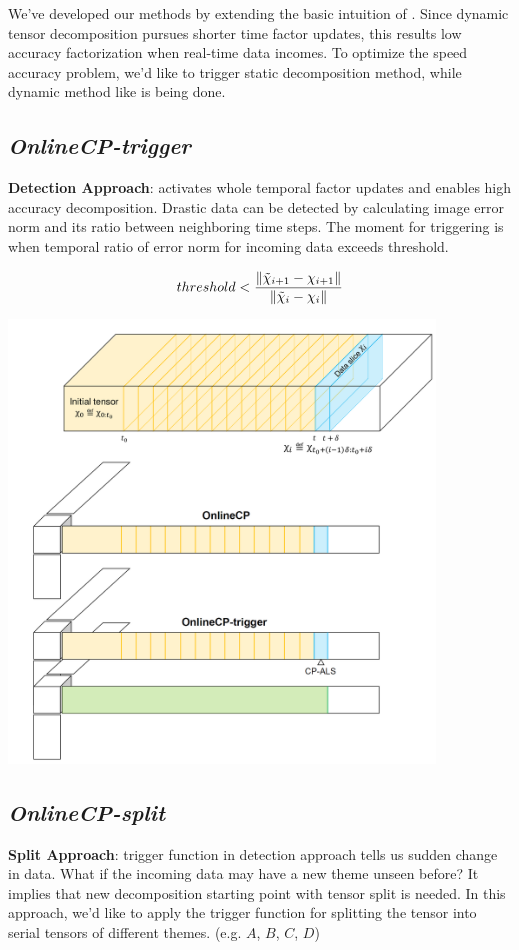 
We've developed our methods by extending the basic intuition of \ocp. Since dynamic tensor decomposition pursues shorter time factor updates, this results low accuracy factorization when real-time data incomes. To optimize the speed accuracy problem, we'd like to trigger static decomposition method, \cpals while dynamic method like \ocp is being done.

\subsection{\em OnlineCP-trigger}
\textbf{Detection Approach}: \cpals activates whole temporal factor updates and enables high accuracy decomposition. Drastic data can be detected by calculating image error norm and its ratio between neighboring time steps. The moment for triggering \cpals is when temporal ratio of error norm for incoming data exceeds threshold.

\begin{align*}
    threshold < \frac{\left\lVert\tilde{\chi}_{i+1}-\chi_{i+1}\right\rVert}{\left\lVert\tilde{\chi}_{i}-\chi_{i}\right\rVert}
\end{align*}

\begin{center}
	\includegraphics[width=0.85\textwidth]{FIG/OnlineCP-trigger.png}
\end{center}

\newpage
\subsection{\em OnlineCP-split}
\textbf{Split Approach}: trigger function in detection approach tells us sudden change in data. What if the incoming data may have a new theme unseen before? It implies that new decomposition starting point with tensor split is needed. In this approach, we'd like to apply the trigger function for splitting the tensor into serial tensors of different themes. (e.g. $A$, $B$, $C$, $D$)


